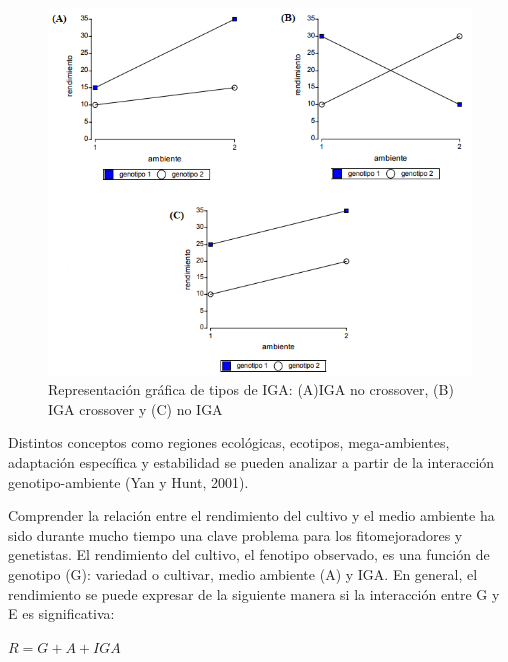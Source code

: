 \begin{figure}[h]
\begin{center}
\includegraphics[width=14cm]{./Graficos/figura1}
\end{center}
\caption{Representación gráfica de tipos de IGA: (A)IGA no crossover, (B) IGA crossover y (C) no IGA}
\end{figure}


Distintos conceptos como regiones ecológicas, ecotipos, mega-ambientes, adaptación específica y estabilidad se pueden analizar a partir de la interacción genotipo-ambiente (Yan y Hunt, 2001).


Comprender la relación entre el rendimiento del cultivo y el medio ambiente ha sido durante mucho tiempo una clave problema para los fitomejoradores y genetistas. El rendimiento del cultivo, el fenotipo observado, es una función de genotipo (G): variedad o cultivar, medio ambiente (A) y IGA. En general, el rendimiento se puede expresar de la siguiente manera si la interacción entre G y E es significativa:
\begin{center}
$R=G+A+IGA$
\end{center}


